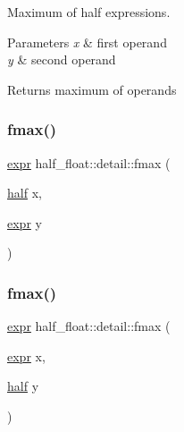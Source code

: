 Maximum of half expressions. 
\begin{DoxyParams}{Parameters}
{\em x} & first operand \\
\hline
{\em y} & second operand \\
\hline
\end{DoxyParams}
\begin{DoxyReturn}{Returns}
maximum of operands 
\end{DoxyReturn}
\mbox{\label{namespacehalf__float_1_1detail_a684ce72377acab35d3568390a12629a4}} 
\subsubsection{\texorpdfstring{fmax()}{fmax()}\hspace{0.1cm}{\footnotesize\ttfamily [2/4]}}
{\footnotesize\ttfamily \hyperlink{structhalf__float_1_1detail_1_1expr}{expr} half\+\_\+float\+::detail\+::fmax (\begin{DoxyParamCaption}\item[{\hyperlink{classhalf__float_1_1half}{half}}]{x,  }\item[{\hyperlink{structhalf__float_1_1detail_1_1expr}{expr}}]{y }\end{DoxyParamCaption})\hspace{0.3cm}{\ttfamily [inline]}}

\mbox{\label{namespacehalf__float_1_1detail_a7bf0e2d7ac5511a0b70b9d4bf2ad3830}} 
\subsubsection{\texorpdfstring{fmax()}{fmax()}\hspace{0.1cm}{\footnotesize\ttfamily [3/4]}}
{\footnotesize\ttfamily \hyperlink{structhalf__float_1_1detail_1_1expr}{expr} half\+\_\+float\+::detail\+::fmax (\begin{DoxyParamCaption}\item[{\hyperlink{structhalf__float_1_1detail_1_1expr}{expr}}]{x,  }\item[{\hyperlink{classhalf__float_1_1half}{half}}]{y }\end{DoxyParamCaption})\hspace{0.3cm}{\ttfamily [inline]}}

